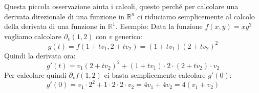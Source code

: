 Questa piccola osservazione aiuta i calcoli, questo perché per calcolare una derivata direzionale di una funzione in $\mathbb{R}^n$ ci riduciamo semplicemente al calcolo della derivata di una funzione in $\mathbb{R}^1$. Esempio: Data la funzione $f(x, y) = xy^2$ vogliamo calcolare $\partial_v (1, 2)$ con $v$ generico:
\begin{equation*}
	g(t) = f(1 + tv_1, 2 + tv_2) = (1 + tv_1)(2 + tv_2)^2
\end{equation*}
Quindi la derivata ora:
\begin{equation*}
	g'(t) = v_1(2 + tv_2)^2 + (1+tv_1) \cdot 2 \cdot (2 + tv_2) \cdot v_2
\end{equation*}
Per calcolare quindi $\partial_v f(1, 2)$ ci basta semplicemente calcolare $g'(0)$:
\begin{equation*}
	g'(0) = v_1 \cdot 2^2 + 1 \cdot 2 \cdot 2 \cdot v_2 = 4v_1 + 4v_2 = 4(v_1 + v_2)
\end{equation*}


